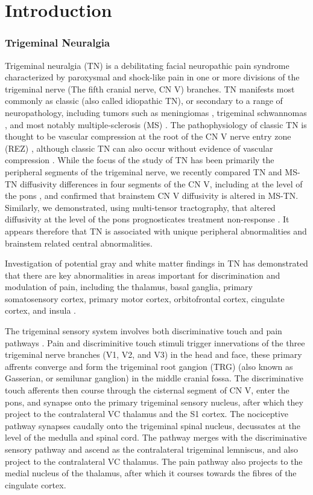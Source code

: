 \section{Introduction}
\subsubsection{Trigeminal Neuralgia}
Trigeminal neuralgia (TN) is a debilitating facial neuropathic pain syndrome characterized by paroxysmal and shock-like pain in one or more divisions of the trigeminal nerve (The fifth cranial nerve, CN V) branches. TN manifests most commonly as classic (also called idiopathic TN), or secondary to a range of neuropathology, including tumors such as meningiomas \cite{Cheng2008}, trigeminal schwannomas \cite{Miller2008}, and most notably multiple-sclerosis (MS) \cite{Cruccu2009,VanderMeijs2002,Nick2012}. The pathophysiology of classic TN is thought to be vascular compression at the root of the CN V nerve entry zone (REZ) \cite{Linn2011,Love2001}, although classic TN can also occur without evidence of vascular compression \cite{Lee2014}. While the focus of the study of TN has been primarily the peripheral segments of the trigeminal nerve, we recently compared TN and MS-TN diffusivity differences in four segments of the CN V, including at the level of the pons \cite{Chen2016a}, and confirmed that brainstem CN V diffusivity is altered in MS-TN. Similarly, we demonstrated, using multi-tensor tractography, that altered diffusivity at the level of the pons prognosticates treatment non-response \cite{Hung2017}. It appears therefore that TN is associated with unique peripheral abnormalities and brainstem related central abnormalities. 

Investigation of potential gray and white matter findings in TN has demonstrated that there are key abnormalities in areas important for discrimination and modulation of pain, including the thalamus, basal ganglia, primary somatosensory cortex, primary motor cortex, orbitofrontal cortex, cingulate cortex, and insula \cite{Desouza2013c, Desouza2013}.

The trigeminal sensory system involves both discriminative touch and pain pathways \cite{Henssen2016}.  Pain and discriminitive touch stimuli trigger innervations of the three trigeminal nerve branches (V1, V2, and V3) in the head and face, these primary affrents converge and form the trigeminal root gangion (TRG) (also known as Gasserian, or semilunar ganglion) in the middle cranial fossa. The discriminative touch afferents then course through the cisternal segment of CN V, enter the pons, and synapse onto the primary trigeminal sensory nucleus, after which they project to the contralateral VC thalamus and the S1 cortex. The nociceptive pathway synapses caudally onto the trigeminal spinal nucleus, decussates at the level of the medulla and spinal cord. The pathway merges with the discriminative sensory pathway and ascend as the contralateral trigeminal lemniscus, and also project to the contralateral VC thalamus. The pain pathway also projects to the medial nucleus of the thalamus, after which it courses towards the fibres of the cingulate cortex. 

